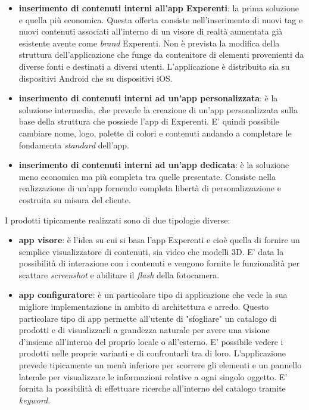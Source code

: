 \begin{itemize}
	\item \textbf{inserimento di contenuti interni all'app Experenti}: la prima soluzione e quella pi\`u economica. Questa offerta consiste nell'inserimento di nuovi tag e nuovi contenuti associati all'interno di un visore di realt\`a aumentata gi\`a esistente avente come \textit{brand} Experenti. Non \`e prevista la modifica della struttura dell'applicazione che funge da contenitore di elementi provenienti da diverse fonti e destinati a diversi utenti. L'applicazione \`e distribuita sia su dispositivi Android che su dispositivi iOS.
	
	\item \textbf{inserimento di contenuti interni ad un'app personalizzata}: \`e la soluzione intermedia, che prevede la creazione di un'app personalizzata sulla base della struttura che possiede l'app di Experenti. E' quindi possibile cambiare nome, logo, palette di colori e contenuti andando a completare le fondamenta \textit{standard} dell'app.
	
	\item \textbf{inserimento di contenuti interni ad un'app dedicata}: \`e la soluzione meno economica ma pi\`u completa tra quelle presentate. Consiste nella realizzazione di un'app fornendo completa libert\`a di personalizzazione e costruita su misura del cliente.
\end{itemize}

I prodotti tipicamente realizzati sono di due tipologie diverse:
\begin{itemize}
	\item \textbf{app visore}: \`e l'idea su cui si basa l'app Experenti e cio\`e quella di fornire un semplice visualizzatore di contenuti, sia video che modelli 3D. E' data la possibilit\`a di interazione con i contenuti e vengono fornite le funzionalit\`a per scattare \textit{screenshot} e abilitare il \textit{flash} della fotocamera.
	
	\item \textbf{app configuratore}: \`e un particolare tipo di applicazione che vede la sua migliore implementazione in ambito di architettura e arredo. Questo particolare tipo di app permette all'utente di "sfogliare" un catalogo di prodotti e di visualizzarli a grandezza naturale per avere una visione d'insieme all'interno del proprio locale o all'esterno. E' possibile vedere i prodotti nelle proprie varianti e di confrontarli tra di loro. L'applicazione prevede tipicamente un men\`u inferiore per scorrere gli elementi e un pannello laterale per visualizzare le informazioni relative a ogni singolo oggetto. E' fornita la possibilit\`a di effettuare ricerche all'interno del catalogo tramite \textit{keyword}.
\end{itemize}


